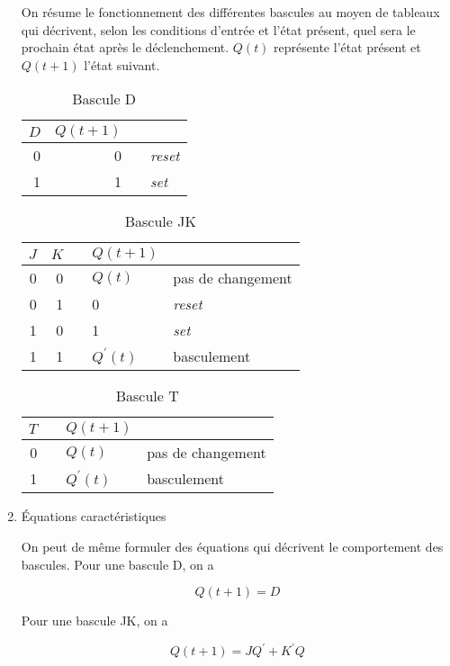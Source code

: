 \documentclass[letter, oneside]{book}
\begin{document}
\begin{enumerate}
On résume le fonctionnement des différentes bascules au moyen de
tableaux qui décrivent, selon les conditions d'entrée et l'état
présent, quel sera le prochain état après le déclenchement. \(Q(t)\)
représente l'état présent et \(Q(t+1)\) l'état suivant.

\begin{table}[htbp]
\caption{\label{tab:org6e7e400}Bascule D}
\centering
\begin{tabular}{rrll}
\(D\) & \(Q(t+1)\) &  & \\[0pt]
\hline
0 & 0 &  & \emph{reset}\\[0pt]
1 & 1 &  & \emph{set}\\[0pt]
\end{tabular}
\end{table}

\begin{table}[htbp]
\caption{\label{tab:org19ca048}Bascule JK}
\centering
\begin{tabular}{rrlll}
\(J\) & \(K\) &  & \(Q(t+1)\) & \\[0pt]
\hline
0 & 0 &  & \(Q(t)\) & pas de changement\\[0pt]
0 & 1 &  & 0 & \emph{reset}\\[0pt]
1 & 0 &  & 1 & \emph{set}\\[0pt]
1 & 1 &  & \(Q^\prime(t)\) & basculement\\[0pt]
\end{tabular}
\end{table}

\begin{table}[htbp]
\caption{\label{tab:orge71572c}Bascule T}
\centering
\begin{tabular}{rlll}
\(T\) &  & \(Q(t+1)\) & \\[0pt]
\hline
0 &  & \(Q(t)\) & pas de changement\\[0pt]
1 &  & \(Q^\prime(t)\) & basculement\\[0pt]
\end{tabular}
\end{table}

\item Équations caractéristiques
\label{sec:org16dd7aa}

On peut de même formuler des équations qui décrivent le comportement
des bascules. Pour une bascule D, on a

$$ Q(t+1) = D $$

Pour une bascule JK, on a

$$ Q(t+1) =J Q^\prime + K^\prime Q $$


\end{enumerate}
\end{document}
